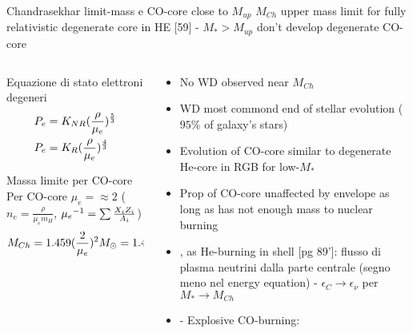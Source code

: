 \begin{frame}{Chandrasekhar limit-mass e CO-core close to $M_{up}$}
$M_{Ch}$ upper mass limit for fully relativistic degenerate core in HE [59] - $M_*>M_{up}$ don't develop degenerate CO-core
\begin{columns}[T]
\begin{column}{0.4\textwidth}
\begin{block}{Equazione di stato elettroni degeneri}
\begin{align*}
&P_e=K_{NR}(\frac{\rho}{\mu_e})^{\frac{5}{3}}\\
&P_e=K_R(\frac{\rho}{\mu_e})^{\frac{4}{3}}
\end{align*}
\end{block}
\begin{block}{Massa limite per CO-core}
Per CO-core $\mu_e=\approx2$ ($n_e=\frac{\rho}{\mu_em_H}$, ${\mu_e}^{-1}=\sum\frac{X_iZ_i}{A_i}$)
\begin{align*}
&M_{Ch}=1.459(\frac{2}{\mu_e})^2M_{\odot}=1.46M_{\odot}
\end{align*}
\end{block}
\end{column}
\begin{column}{0.6\textwidth}
\begin{itemize}
\item No WD observed near $M_{Ch}$
\item WD most commond end of stellar evolution ($95\%$ of galaxy's stars)
\item Evolution of CO-core similar to degenerate He-core in RGB for low-$M_*$
\item Prop of CO-core unaffected by envelope as long as has not enough mass to nuclear burning
\item {},  as He-burning in shell [pg 89']: flusso di plasma neutrini dalla parte centrale \xaumenta{\epsilon_{\nu}}(segno meno nel energy equation) - $\epsilon_C\to\epsilon_{\nu}$ per $M_*\to M_{Ch}$
\item {}  - Explosive CO-burning: 

\end{itemize}
\end{column}
\end{columns}
\end{frame}

